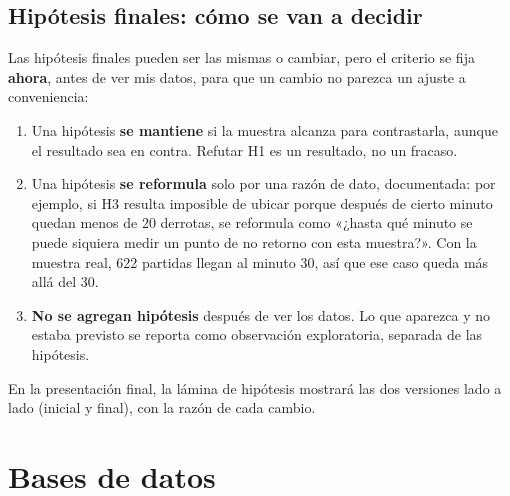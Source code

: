 \documentclass[11pt,letterpaper]{article}
\begin{document}
\subsection{Hipótesis finales: cómo se van a decidir}

Las hipótesis finales pueden ser las mismas o cambiar, pero el criterio se fija
\textbf{ahora}, antes de ver mis datos, para que un cambio no parezca un ajuste a
conveniencia:

\begin{enumerate}[leftmargin=1.6em,itemsep=.3em]
  \item Una hipótesis \textbf{se mantiene} si la muestra alcanza para contrastarla,
        aunque el resultado sea en contra. Refutar H1 es un resultado, no un fracaso.
  \item Una hipótesis \textbf{se reformula} solo por una razón de dato, documentada:
        por ejemplo, si H3 resulta imposible de ubicar porque después de cierto minuto
        quedan menos de 20 derrotas, se reformula como «¿hasta qué minuto se puede
        siquiera medir un punto de no retorno con esta muestra?». Con la muestra real,
        622 partidas llegan al minuto 30, así que ese caso queda más allá del 30.
  \item \textbf{No se agregan hipótesis} después de ver los datos. Lo que aparezca y
        no estaba previsto se reporta como observación exploratoria, separada de
        las hipótesis.
\end{enumerate}

\noindent En la presentación final, la lámina de hipótesis mostrará las dos versiones
lado a lado (inicial y final), con la razón de cada cambio.

\section{Bases de datos}
\label{sec:datos}
\end{document}
